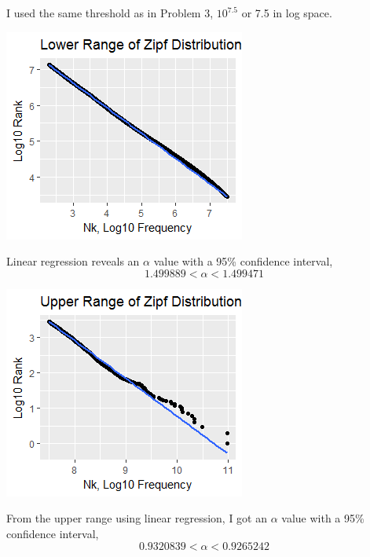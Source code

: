 I used the same threshold as in Problem 3, $10^{7.5}$ or 7.5 in log space.

\includegraphics{Problem4_lower_range.png}

Linear regression reveals an $\alpha$ value with a 95\% confidence interval,
$$
    1.499889 < \alpha < 1.499471
$$

\includegraphics{Problem4_upper_range.png}

From the upper range using linear regression, I got an $\alpha$ value with a 95\% confidence interval,
$$
    0.9320839 < \alpha < 0.9265242
$$
